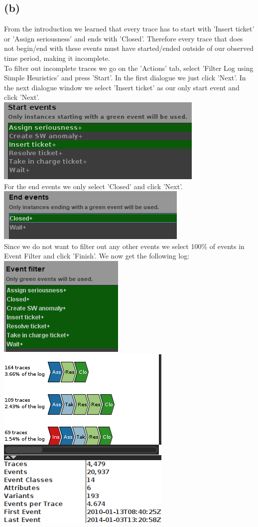 \documentclass[../../main.tex]{subfiles}
\begin{document}
\subsection*{(b)}
From the introduction we learned that every trace has to start with 'Insert ticket' or 'Assign seriousness' and ends with 'Closed'. Therefore every trace that does not begin/end with these events must have started/ended outside of our observed time period, making it incomplete.\\
To filter out incomplete traces we go on the 'Actions' tab, select 'Filter Log using Simple Heuristics' and press 'Start'. In the first dialogue we just click 'Next'. In the next dialogue window we select 'Insert ticket' as our only start event and click 'Next'. \\
\includegraphics[width=0.5\columnwidth]{img/ProM_b_filter_traces_start.png}\\
For the end events we only select 'Closed' and click 'Next'. \\
\includegraphics[width=0.5\columnwidth]{img/ProM_b_filter_traces_end.png}\\
Since we do not want to filter out any other events we select 100\% of events in Event Filter and click 'Finish'. We now get the following log:\\
\includegraphics[width=0.5\columnwidth]{img/ProM_b_filter_traces_events.png}
\includegraphics[width=0.5\columnwidth]{img/ProM_b_filter_log.png}\\
\end{document}

